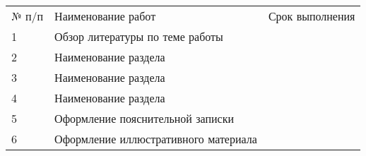 
\begin{center}

	\vspace*{1.5cm}

	\confirmation

	\vspace*{1.5cm}
	
	\worktitle

	\vspace*{1cm}
	
	\begin{tabularx}{\textwidth}{ l X l }
		№ п/п & Наименование работ & Срок выполнения \\
		1 & Обзор литературы по теме работы & \\
		2 & Наименование раздела & \\
		3 & Наименование раздела & \\
		4 & Наименование раздела & \\
		5 & Оформление пояснительной записки & \\
		6 & Оформление иллюстративного материала & \\
	\end{tabularx}

	\vspace*{5cm}

	\subsblock
\end{center}
